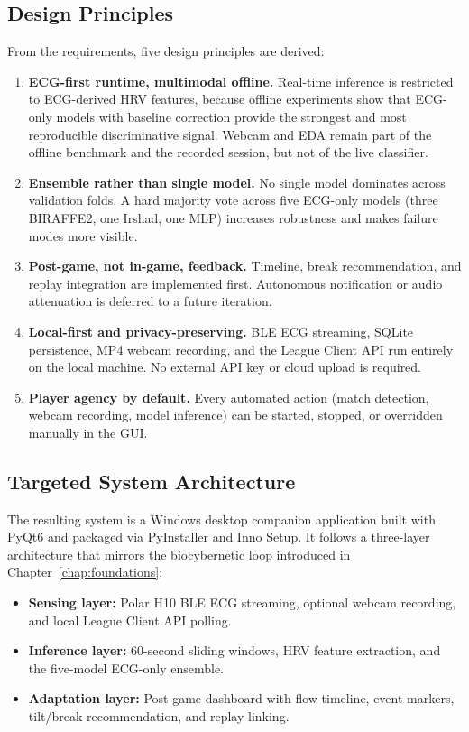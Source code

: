 \subsection{Design Principles}

From the requirements, five design principles are derived:

\begin{enumerate}
    \item \textbf{ECG-first runtime, multimodal offline.} Real-time inference is restricted to ECG-derived HRV features, because offline experiments show that ECG-only models with baseline correction provide the strongest and most reproducible discriminative signal. Webcam and EDA remain part of the offline benchmark and the recorded session, but not of the live classifier.
    \item \textbf{Ensemble rather than single model.} No single model dominates across validation folds. A hard majority vote across five ECG-only models (three BIRAFFE2, one Irshad, one MLP) increases robustness and makes failure modes more visible.
    \item \textbf{Post-game, not in-game, feedback.} Timeline, break recommendation, and replay integration are implemented first. Autonomous notification or audio attenuation is deferred to a future iteration.
    \item \textbf{Local-first and privacy-preserving.} BLE ECG streaming, SQLite persistence, MP4 webcam recording, and the League Client API run entirely on the local machine. No external API key or cloud upload is required.
    \item \textbf{Player agency by default.} Every automated action (match detection, webcam recording, model inference) can be started, stopped, or overridden manually in the GUI.
\end{enumerate}

\subsection{Targeted System Architecture}

The resulting system is a Windows desktop companion application built with PyQt6 and packaged via PyInstaller and Inno Setup. It follows a three-layer architecture that mirrors the biocybernetic loop introduced in Chapter~\ref{chap:foundations}:

\begin{itemize}
    \item \textbf{Sensing layer:} Polar H10 BLE ECG streaming, optional webcam recording, and local League Client API polling.
    \item \textbf{Inference layer:} 60-second sliding windows, HRV feature extraction, and the five-model ECG-only ensemble.
    \item \textbf{Adaptation layer:} Post-game dashboard with flow timeline, event markers, tilt/break recommendation, and replay linking.
\end{itemize}

